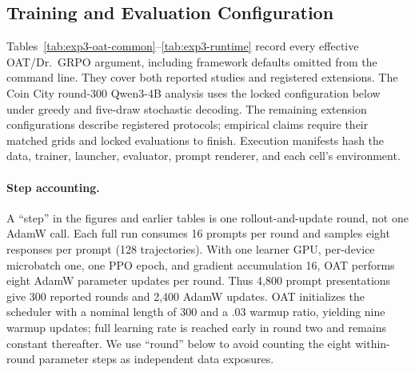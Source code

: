 \subsection{Training and Evaluation Configuration}
\label{app:exp3-complete-training-setup}

Tables~\ref{tab:exp3-oat-common}--\ref{tab:exp3-runtime} record every effective
OAT/Dr.~GRPO argument, including framework defaults omitted from the command line.
They cover both reported studies and registered extensions. The Coin City
round-300 Qwen3-4B analysis uses the locked configuration below under greedy and
five-draw stochastic decoding. The remaining extension configurations describe
registered protocols; empirical claims require their matched grids and locked
evaluations to finish. Execution manifests hash the data, trainer, launcher,
evaluator, prompt renderer, and each cell's environment.

\paragraph{Step accounting.}
A ``step'' in the figures and earlier tables is one rollout-and-update round, not one
AdamW call.  Each full run consumes 16 prompts per round and samples eight responses
per prompt (128 trajectories).  With one learner GPU, per-device microbatch one, one
PPO epoch, and gradient accumulation 16, OAT performs eight AdamW parameter updates per
round. Thus 4,800 prompt presentations give 300 reported rounds and 2,400 AdamW
updates. OAT initializes the scheduler with a nominal length of 300 and a .03
warmup ratio, yielding nine warmup updates; full learning rate is reached early
in round two and remains constant thereafter. We use ``round'' below to avoid
counting the eight within-round parameter steps as independent data exposures.


